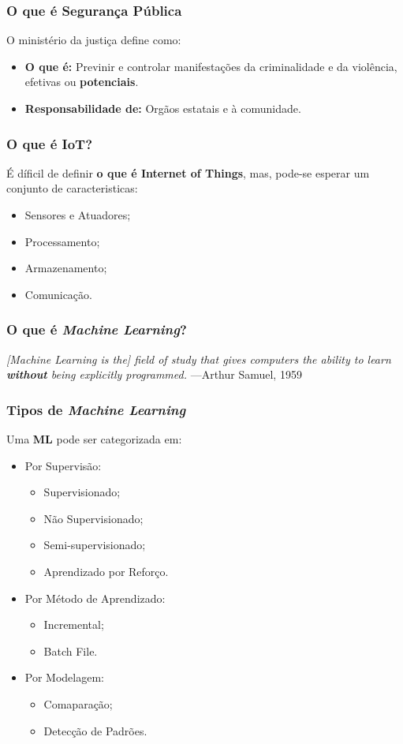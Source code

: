 \begin{frame}
	\frametitle{O que é Segurança Pública}
	O ministério da justiça\cite{seguranca-publica} define como:
	\begin{itemize}
		\item \textbf{O que é:}
		Previnir e controlar manifestações da criminalidade
		e da violência, efetivas ou \textbf{potenciais}.
		\item \textbf{Responsabilidade de:}
		Orgãos estatais e à comunidade.
	\end{itemize}
\end{frame}

\begin{frame}
	\frametitle{O que é IoT?}

	É díficil de definir \textbf{o que é Internet of Things}, mas,	pode-se 
	esperar um conjunto de caracteristicas\cite{iot-definition}:
	\begin{itemize}
	\item Sensores e Atuadores;
	\item Processamento;
	\item Armazenamento;
	\item Comunicação.
	\end{itemize}
\end{frame}

\begin{frame}
	\frametitle{O que é \textit{Machine Learning}?}
	\textit{[Machine  Learning  is  the]  field  of  study  that  gives  computers  the  ability  to  learn
	\textbf{without} being explicitly programmed.}
	—Arthur Samuel, 1959
\end{frame}

\begin{frame}
	\frametitle{Tipos de \textit{Machine Learning}}
	Uma \textbf{ML} pode ser categorizada\cite{machine-learning} em:
	\begin{itemize}[<+->]
		\item Por Supervisão:
			\begin{itemize}[<+->]
				\item Supervisionado;
				\item Não Supervisionado;
				\item Semi-supervisionado;
				\item Aprendizado por Reforço.
			\end{itemize}	
		\item Por Método de Aprendizado:
			\begin{itemize}[<+->]
				\item Incremental;
				\item Batch File.
			\end{itemize}
		\item Por Modelagem:
		\begin{itemize}[<+->]
			\item Comaparação;
			\item Detecção de Padrões.
		\end{itemize}
	\end{itemize}	
\end{frame}